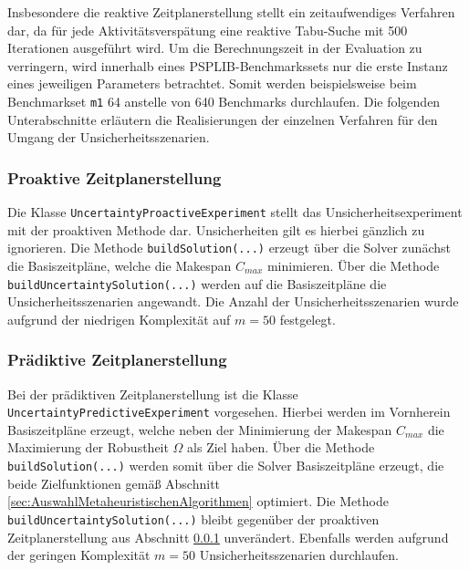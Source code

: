 Insbesondere die reaktive Zeitplanerstellung stellt ein zeitaufwendiges Verfahren dar, da für jede Aktivitätsverspätung eine reaktive Tabu-Suche mit 500 Iterationen ausgeführt wird. Um die Berechnungszeit in der Evaluation zu verringern, wird innerhalb eines PSPLIB-Benchmarkssets nur die erste Instanz eines jeweiligen Parameters betrachtet. Somit werden beispielsweise beim Benchmarkset \lstinline|m1| 64 anstelle von 640 Benchmarks durchlaufen. Die folgenden Unterabschnitte erläutern die Realisierungen der einzelnen Verfahren für den Umgang der Unsicherheitsszenarien. 

\subsubsection{Proaktive Zeitplanerstellung} \label{subsec:ProaktiveZeitplanerstellung}

Die Klasse \lstinline|UncertaintyProactiveExperiment| stellt das Unsicherheitsexperiment mit der proaktiven Methode dar. Unsicherheiten gilt es hierbei gänzlich zu ignorieren. Die Methode \lstinline|buildSolution(...)| erzeugt über die Solver zunächst die Basiszeitpläne, welche die Makespan $C_{max}$ minimieren. Über die Methode \lstinline|buildUncertaintySolution(...)| werden auf die Basiszeitpläne die Unsicherheitsszenarien angewandt. Die Anzahl der Unsicherheitsszenarien wurde aufgrund der niedrigen Komplexität auf $m = 50$ festgelegt. 

\subsubsection{Prädiktive Zeitplanerstellung} \label{subsec:PrädiktiveZeitplanerstellung}

Bei der prädiktiven Zeitplanerstellung ist die Klasse \lstinline|UncertaintyPredictiveExperiment| vorgesehen. Hierbei werden im Vornherein Basiszeitpläne erzeugt, welche neben der Minimierung der Makespan $C_{max}$ die Maximierung der Robustheit $\Omega$ als Ziel haben. Über die Methode \lstinline|buildSolution(...)| werden somit über die Solver Basiszeitpläne erzeugt, die beide Zielfunktionen gemäß Abschnitt \ref{sec:AuswahlMetaheuristischenAlgorithmen} optimiert. Die Methode \lstinline|buildUncertaintySolution(...)| bleibt gegenüber der proaktiven Zeitplanerstellung aus Abschnitt \ref{subsec:ProaktiveZeitplanerstellung} unverändert. Ebenfalls werden aufgrund der geringen Komplexität $m = 50$ Unsicherheitsszenarien durchlaufen. \\

